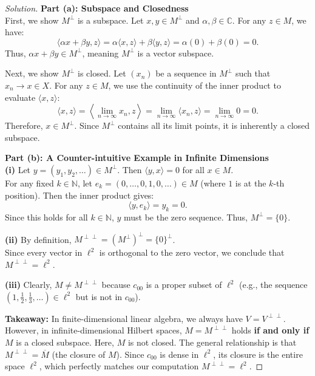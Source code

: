 \documentclass{article}
\begin{document}
\begin{proof}[Solution]
    \textbf{Part (a): Subspace and Closedness} \\
    First, we show $M^\perp$ is a subspace. Let $x, y \in M^\perp$ and $\alpha, \beta \in \mathbb{C}$. For any $z \in M$, we have:
    \[ \langle \alpha x + \beta y, z \rangle = \alpha \langle x, z \rangle + \beta \langle y, z \rangle = \alpha(0) + \beta(0) = 0. \]
    Thus, $\alpha x + \beta y \in M^\perp$, meaning $M^\perp$ is a vector subspace.

    Next, we show $M^\perp$ is closed. Let $(x_n)$ be a sequence in $M^\perp$ such that $x_n \to x \in X$. For any $z \in M$, we use the continuity of the inner product to evaluate $\langle x, z \rangle$:
    \[ \langle x, z \rangle = \left\langle \lim_{n \to \infty} x_n, z \right\rangle = \lim_{n \to \infty} \langle x_n, z \rangle = \lim_{n \to \infty} 0 = 0. \]
    Therefore, $x \in M^\perp$. Since $M^\perp$ contains all its limit points, it is inherently a closed subspace.

    \vspace{1em}
    \textbf{Part (b): A Counter-intuitive Example in Infinite Dimensions} \\
    \textbf{(i)} Let $y = (y_1, y_2, \ldots) \in M^\perp$. Then $\langle y, x \rangle = 0$ for all $x \in M$. \\
    For any fixed $k \in \mathbb{N}$, let $e_k = (0, \ldots, 0, 1, 0, \ldots) \in M$ (where $1$ is at the $k$-th position). 
    Then the inner product gives:
    \[ \langle y, e_k \rangle = y_k = 0. \]
    Since this holds for all $k \in \mathbb{N}$, $y$ must be the zero sequence. Thus, $M^\perp = \{0\}$.

    \vspace{0.5em}
    \textbf{(ii)} By definition, $M^{\perp\perp} = (M^\perp)^\perp = \{0\}^\perp$. \\
    Since every vector in $\ell^2$ is orthogonal to the zero vector, we conclude that $M^{\perp\perp} = \ell^2$.

    \vspace{0.5em}
    \textbf{(iii)} Clearly, $M \neq M^{\perp\perp}$ because $c_{00}$ is a proper subset of $\ell^2$ (e.g., the sequence $(1, \frac{1}{2}, \frac{1}{3}, \ldots) \in \ell^2$ but is not in $c_{00}$). 
    
    \noindent \textbf{Takeaway:} In finite-dimensional linear algebra, we always have $V = V^{\perp\perp}$. However, in infinite-dimensional Hilbert spaces, $M = M^{\perp\perp}$ holds \textbf{if and only if} $M$ is a closed subspace. Here, $M$ is not closed. The general relationship is that $M^{\perp\perp} = \overline{M}$ (the closure of $M$). Since $c_{00}$ is dense in $\ell^2$, its closure is the entire space $\ell^2$, which perfectly matches our computation $M^{\perp\perp} = \ell^2$.
\end{proof}
\end{document}
